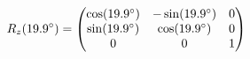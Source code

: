 \documentclass[preview]{standalone}
\begin{document}
\begin{align*}
\special{dvisvgm:raw <g id='unique000'>}R_z(19.9^\circ) = \begin{pmatrix} \cos(19.9^\circ) & -\sin(19.9^\circ) & 0 \\ \sin(19.9^\circ) & \cos(19.9^\circ) & 0 \\ 0 & 0 & 1 \end{pmatrix}\special{dvisvgm:raw </g>}
\end{align*}
\end{document}
